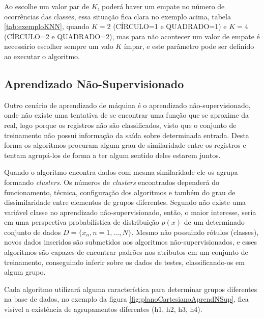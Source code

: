 Ao escolhe um valor par de ${K}$, poderá haver um empate no número de ocorrências das classes, essa situação fica clara no exemplo acima, tabela \ref{tab:exemploKNN}, quando ${K=2}$ (CÍRCULO=1 e QUADRADO=1) e ${K=4}$ (CÍRCULO=2 e QUADRADO=2), mas para não acontecer um valor de empate é necessário escolher sempre um valo ${K}$ ímpar, e este parâmetro pode ser definido ao executar o algoritmo.


\subsection{Aprendizado Não-Supervisionado}\label{ssec:aprendNSup}

Outro cenário de aprendizado de máquina é o aprendizado não-supervisionado, onde não existe uma tentativa de se encontrar uma função que se aproxime da real, logo porque os registros não são classificados, visto que o conjunto de treinamento não possui informação da saída sobre determinada entrada. Desta forma os algoritmos procuram algum grau de similaridade entre os registros e tentam agrupá-los de forma a ter algum sentido deles estarem juntos. 

Quando o algoritmo encontra dados com mesma similaridade ele os agrupa formando \textit{clusters}. Os números de \textit{clusters} encontrados dependerá do funcionamento, técnica, configuração dos algoritmos e também do grau de dissimilaridade entre elementos de grupos diferentes. Segundo  não existe uma variável classe no aprendizado não-supervisionado, então, o maior interesse, seria em uma perspectiva probabilística de distribuição ${p(x)}$ de um determinado conjunto de dados ${D = \{x_{n},n=1,...,N\}}$. Mesmo não possuindo rótulos (classes), novos dados inseridos são submetidos aos algoritmos não-supervisionados, e esses algoritmos são capazes de encontrar padrões nos atributos em um conjunto de treinamento, conseguindo inferir sobre os dados de testes, classificando-os em algum grupo. 

Cada algoritmo utilizará alguma característica para determinar grupos diferentes na base de dados, no exemplo da figura \ref{fig:planoCartesianoAprendNSup}, fica visível a existência de agrupamentos diferentes (h1, h2, h3, h4). 


